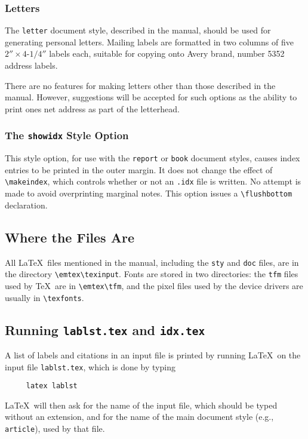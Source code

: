  
\subsubsection{Letters} \label{sec:letters}
 
The \mbox{\tt letter} document style, described in the manual, should
be used for generating personal letters.
Mailing labels are formatted in two columns of five
$2''\times\mbox{4-1/4}''$ labels each, suitable for copying onto Avery
brand, number 5352 address labels.
 
There are no features for making letters other than those described in
the manual.  However, suggestions will be accepted for such options as
the ability to print ones net address as part of the letterhead.
 
\subsubsection{The {\tt showidx} Style Option}
 
This style option, for use with the {\tt report} or {\tt book} document
styles, causes index entries to be printed in the outer margin.  It
does not change the effect of \verb|\makeindex|, which controls
whether or not an {\tt .idx} file is written.  No attempt is made to
avoid overprinting marginal notes.  This option issues a 
\verb|\flushbottom| declaration.
 
\subsection{Where the Files Are}
 
%
 
All \LaTeX\ files mentioned in the manual, including the {\tt sty} and
{\tt doc} files, are in the directory \verb|\emtex\texinput|.
Fonts are stored in two directories: the {\tt tfm} files used by \TeX\
are in \verb|\emtex\tfm|, and the pixel files used by the device drivers
are usually in \verb|\texfonts|.
 
\subsection{Running {\tt lablst.tex} and {\tt idx.tex}}
 
A list of labels and citations in an input file is printed
by running \LaTeX\ on the input file \mbox{\tt lablst.tex},
which is done by typing
\begin{verbatim}
     latex lablst
\end{verbatim}
\LaTeX\ will then ask for the name of the input file, which should be
typed without an extension, and for the name of the main document style
(e.g., \mbox{\tt article}), used by that file.
 
